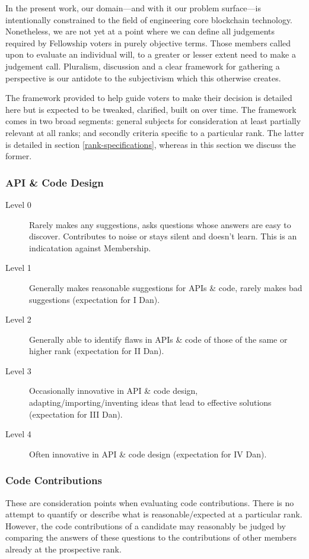 \documentclass[9pt,oneside]{amsart}
\begin{document}
In the present work, our domain---and with it our problem surface---is intentionally constrained to the field of engineering core blockchain technology. Nonetheless, we are not yet at a point where we can define all judgements required by Fellowship voters in purely objective terms. Those members called upon to evaluate an individual will, to a greater or lesser extent need to make a judgement call. Pluralism, discussion and a clear framework for gathering a perspective is our antidote to the subjectivism which this otherwise creates.

The framework provided to help guide voters to make their decision is detailed here but is expected to be tweaked, clarified, built on over time. The framework comes in two broad segments: general subjects for consideration at least partially relevant at all ranks; and secondly criteria specific to a particular rank. The latter is detailed in section \ref{rank-specifications}, whereas in this section we discuss the former.

\subsubsection{API \& Code Design}

\begin{description}
  \item[Level 0] Rarely makes any suggestions, asks questions whose answers are easy to discover. Contributes to noise or stays silent and doesn't learn. This is an indicatation against Membership.
  \item[Level 1] Generally makes reasonable suggestions for APIs \& code, rarely makes bad suggestions (expectation for I Dan).
  \item[Level 2] Generally able to identify flaws in APIs \& code of those of the same or higher rank (expectation for II Dan).
  \item[Level 3] Occasionally innovative in API \& code design, adapting/importing/inventing ideas that lead to effective solutions (expectation for III Dan).
  \item[Level 4] Often innovative in API \& code design (expectation for IV Dan).
\end{description}

\subsubsection{Code Contributions}

These are consideration points when evaluating code contributions. There is no attempt to quantify or describe what is reasonable/expected at a particular rank. However, the code contributions of a candidate may reasonably be judged by comparing the answers of these questions to the contributions of other members already at the prospective rank.
\end{document}
